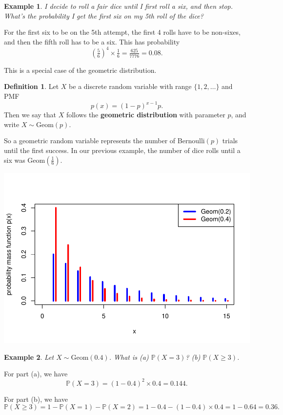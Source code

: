 \documentclass[
  a4paper,
]{book}
\theoremstyle{definition}
\newtheorem{definition}{Definition}[chapter]
\theoremstyle{definition}
\newtheorem{example}{Example}[chapter]
\theoremstyle{definition}
\theoremstyle{definition}
\theoremstyle{remark}
\begin{document}
\begin{example}
\emph{I decide to roll a fair dice until I first roll a six, and then stop. What's the probability I get the first six on my 5th roll of the dice?}

For the first six to be on the 5th attempt, the first 4 rolls have to be non-sixes, and then the fifth roll has to be a six. This has probability
\[ \left(\tfrac56\right)^4 \times  \tfrac16 = \tfrac{625}{7776} = 0.08.\]
\end{example}

This is a special case of the geometric distribution.

\begin{definition}
Let \(X\) be a discrete random variable with range \(\{1,2,\dots\}\) and PMF
\[ p(x) = (1-p)^{x-1}p . \]
Then we say that \(X\) follows the \textbf{geometric distribution} with parameter \(p\), and write \(X \sim \text{Geom}(p)\).
\end{definition}

So a geometric random variable represents the number of Bernoulli\((p)\) trials until the first success. In our previous example, the number of dice rolls until a six was \(\text{Geom}(\frac16)\).

\includegraphics{math1710_files/figure-latex/geom-pic-1.pdf}

\begin{example}
\emph{Let \(X \sim \mathrm{Geom}(0.4)\). What is (a) \(\mathbb P(X = 3)\)? (b) \(\mathbb P(X \geq 3)\).}

For part (a), we have
\[ \mathbb P(X = 3) = (1 - 0.4)^2 \times 0.4 = 0.144 . \]

For part (b), we have
\[ \mathbb P(X \geq 3) = 1 - \mathbb P(X =1) - \mathbb P(X = 2) = 1 - 0.4 - (1-0.4)\times 0.4 = 1- 0.64 = 0.36 . \]
\end{example}
\end{document}
